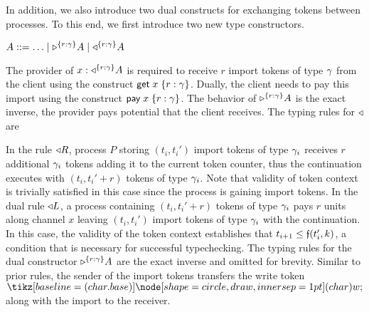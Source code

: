 In addition, we also introduce two dual constructs for exchanging tokens
between processes.
To this end, we first introduce two new type constructors.
\begin{center}
\begin{minipage}{0cm}
\begin{tabbing}
$A ::= \ldots \mid \tpaypot{A}{r : \K} \mid \tgetpot{A}{r : \K}$
\end{tabbing}
\end{minipage}
\end{center}
The provider of $x : \tgetpot{A}{r : \K}$ is required to receive
$r$ import tokens of type $\K$ from the client using the construct
$\eget{x}{r : \K}$. Dually, the client needs to pay this import
using the construct $\epay{x}{r : \K}$.
The behavior of $\tpaypot{A}{r : \K}$ is the exact inverse, the
provider pays potential that the client receives.
The typing rules for $\getpot$ are
In the rule $\getpot R$, process $P$ storing $(t_i, t_i')$ import tokens of type $\K_i$
receives $r$ additional $\K_i$ tokens adding it to the current token counter, thus
the continuation executes with $(t_i, t_i'+r)$ tokens of type $\K_i$.
Note that validity of token context is trivially satisfied in this case since the
process is gaining import tokens.
%
In the dual rule $\getpot L$, a process containing $(t_i, t_i'+r)$ tokens of type $\K_i$
pays $r$ units along channel $x$ leaving $(t_i, t_i')$ import tokens of type $\K_i$ with
the continuation.
In this case, the validity of the token context establishes that $t_{i+1} \leq \GlobalF(t_i',k)$,
a condition that is necessary for successful typechecking.
The typing rules for the dual constructor $\tpaypot{A}{r : \K}$
are the exact inverse and omitted for brevity.
Similar to prior rules, the sender of the import tokens transfers the write token $\wt$
along with the import to the receiver.

